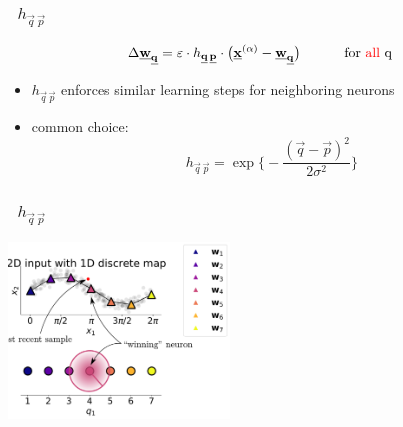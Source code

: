 \begin{frame}[t] \frametitle{\subsecname~$h_{\vec{q} \, \vec{p}}$} 
\begin{equation}
	\Delta \vec{w}_{\vec q} = \varepsilon \cdot h_{\vec{q} \, \vec{p}} \cdot
  \big( \vec{x}^{(\alpha)} - \vec{w}_{\vec q} \big) \text{\hspace{1cm} for \textcolor{red}{all} q}
  \end{equation}
\begin{itemize}
	\item $h_{\vec{q} \, \vec{p}}$ enforces similar learning steps for neighboring neurons
	\item common choice:
	\begin{equation}
		h_{\vec{q} \, \vec{p}} = \exp \bigg\{ - \frac{ (\vec{q}
			- \vec{p} )^2 }{2 \sigma^2} \bigg\}
			\end{equation}
\end{itemize}
\end{frame}

\begin{frame}[t] \frametitle{\subsecname~$h_{\vec{q} \, \vec{p}}$} 

\svspace{-5mm}

\begin{center}
	\includegraphics[width=0.44\textwidth]{img/sin_manifold_map_rbf}
\end{center}


\svspace{-3mm}



\svspace{-3mm}


\begin{itemize}
\end{itemize}

\end{frame}


